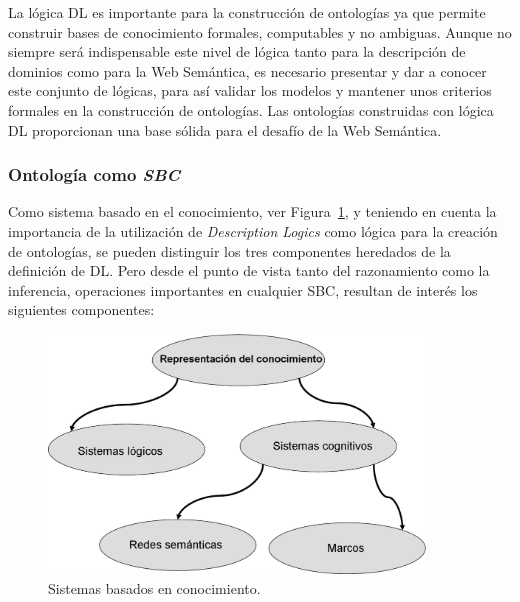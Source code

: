 La lógica DL es importante para la construcción de ontologías ya que permite
construir bases de conocimiento formales, computables y no ambiguas. Aunque no siempre será indispensable este nivel 
de lógica tanto para la descripción de dominios
como para la Web Semántica, es necesario presentar y dar a conocer este conjunto
de lógicas, para así validar los modelos y mantener unos criterios
formales en la construcción de ontologías. Las ontologías construidas con lógica
DL proporcionan una base sólida para el desafío de la Web Semántica.


\subsubsection{Ontología como \textit{SBC}}
Como sistema basado en el conocimiento, ver Figura~\ref{fig:knowledge}, y teniendo en
cuenta la importancia de la utilización de \textit{Description Logics} como lógica para
la creación de ontologías, se pueden distinguir los tres componentes heredados de
la definición de \gls{DL}. Pero desde el punto de vista tanto del razonamiento como la
inferencia, operaciones importantes en cualquier \gls{SBC}, resultan de interés los
siguientes componentes:


\begin{figure}[htb]
\centering
	\includegraphics[width=10cm]{images/knowledge}
\caption{Sistemas basados en conocimiento.}
\label{fig:knowledge}
\end{figure}


